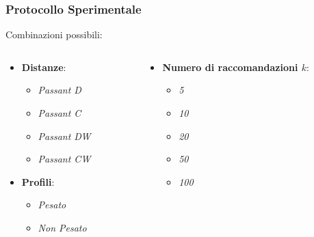 \documentclass{beamer}
\begin{document}

\begin{frame}
	\frametitle{Protocollo Sperimentale}
	Combinazioni possibili:
	\begin{columns}[t]
		\begin{column}{0.5\textwidth}
				\begin{itemize}
					\setlength{\itemsep}{10pt}
					\item<1-> \textbf{Distanze}:
					\begin{itemize}
						\item \emph{Passant D}
						\item \emph{Passant C}
						\item \emph{Passant DW}
						\item \emph{Passant CW}
					\end{itemize}
					\item<2-> \textbf{Profili}:
					\begin{itemize}
						\item \emph{Pesato}
						\item \emph{Non Pesato}
					\end{itemize}
				\end{itemize}
		\end{column}
		\begin{column}{0.5\textwidth}
			\begin{itemize}
				\item<3-> \textbf{Numero di raccomandazioni $k$}:
				\begin{itemize}
					\item \emph{5}
					\item \emph{10}	
					\item \emph{20}
					\item \emph{50}
					\item \emph{100}
				\end{itemize}
			\end{itemize}
		\end{column}
	\end{columns}
	\end{frame}

\end{document}
